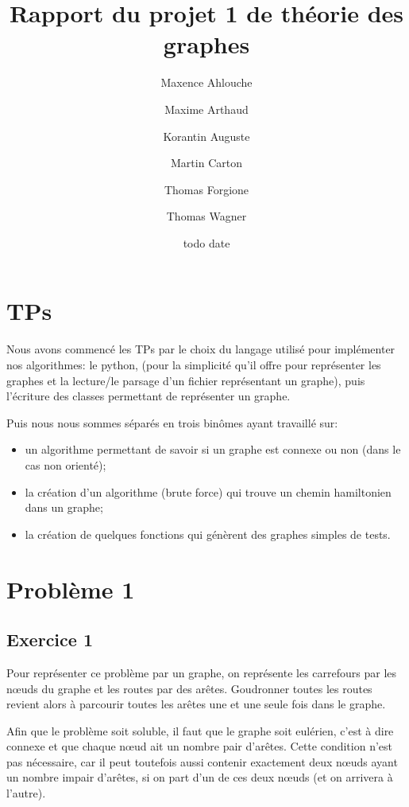 \documentclass[draft]{scrartcl}
\begin{document}
\title{Rapport du projet 1 de théorie des graphes}
\author{Maxence Ahlouche \and Maxime Arthaud \and Korantin Auguste
          \and Martin Carton \and Thomas Forgione \and Thomas Wagner}
\date{todo date}
\maketitle

\section{TPs} %
    Nous avons commencé les TPs par le choix du langage utilisé pour
    implémenter nos algorithmes: le python, (pour la simplicité qu'il offre pour
    représenter les graphes et la lecture/le parsage d'un fichier représentant
    un graphe), puis l'écriture des classes permettant de représenter un
    graphe.

    Puis nous nous sommes séparés en trois binômes ayant travaillé sur:
    \begin{itemize}
      \item un algorithme permettant de savoir si un graphe est connexe ou non
        (dans le cas non orienté);
      \item  la création d'un algorithme (brute force) qui trouve un chemin
        hamiltonien dans un graphe;
      \item  la création de quelques fonctions qui génèrent des graphes simples
        de tests.
    \end{itemize}
    
\section{Problème 1}
  \subsection{Exercice 1}
    Pour représenter ce problème par un graphe, on représente les carrefours
    par les nœuds du graphe et les routes par des arêtes. Goudronner toutes les
    routes revient alors à parcourir toutes les arêtes une et une seule fois
    dans le graphe.

    Afin que le problème soit soluble, il faut que le graphe soit eulérien,
    c'est à dire connexe et que chaque nœud ait un nombre pair d'arêtes. Cette
    condition n'est pas nécessaire, car il peut toutefois aussi contenir
    exactement deux nœuds ayant un nombre impair d'arêtes, si on part d'un de
    ces deux nœuds (et on arrivera à l'autre).
\end{document}
